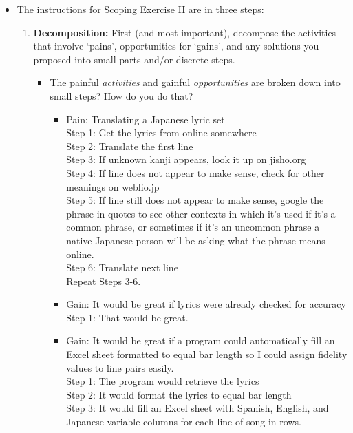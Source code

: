 \documentclass[12pt]{article}
\begin{document}
\begin{itemize}
    \item The instructions for Scoping Exercise II are in three steps:
    \begin{enumerate}
        \item \textbf{Decomposition:} First (and most important), decompose the activities that involve ‘pains’, opportunities for ‘gains’, and any solutions you proposed into small parts and/or discrete steps.
        \begin{itemize}
            \item The painful \textit{activities} and gainful \textit{opportunities} are broken down into small steps? How do you do that? 
            \begin{itemize}
                \item Pain: Translating a Japanese lyric set 
                \\Step 1: Get the lyrics from online somewhere 
                \\Step 2: Translate the first line
                \\Step 3: If unknown kanji appears, look it up on jisho.org
                \\Step 4: If line does not appear to make sense, check for other meanings on weblio.jp
                \\Step 5: If line still does not appear to make sense, google the phrase in quotes to see other contexts in which it's used if it's a common phrase, or sometimes if it's an uncommon phrase a native Japanese person will be asking what the phrase means online.
                \\Step 6: Translate next line
                \\Repeat Steps 3-6.
                \vspace{0.5em}
                \item Gain: It would be great if lyrics were already checked for accuracy
                \\Step 1: That would be great.
                \vspace{0.5em}
                \item Gain: It would be great if a program could automatically fill an Excel sheet formatted to equal bar length so I could assign fidelity values to line pairs easily.
                \\Step 1: The program would retrieve the lyrics
                \\Step 2: It would format the lyrics to equal bar length
                \\Step 3: It would fill an Excel sheet with Spanish, English, and Japanese variable columns for each line of song in rows.

\end{itemize}
\end{itemize}
\end{enumerate}
\end{itemize}
\end{document}
